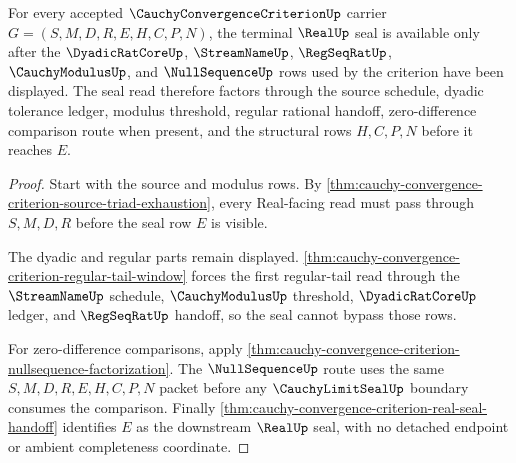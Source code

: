 \begin{theorem}
\label{thm:cauchy-convergence-criterion-real-seal-route}
For every accepted $\CauchyConvergenceCriterionUp$ carrier $G=(S,M,D,R,E,H,C,P,N)$, the terminal $\RealUp$ seal is available only after the $\DyadicRatCoreUp$, $\StreamNameUp$, $\RegSeqRatUp$, $\CauchyModulusUp$, and $\NullSequenceUp$ rows used by the criterion have been displayed. The seal read therefore factors through the source schedule, dyadic tolerance ledger, modulus threshold, regular rational handoff, zero-difference comparison route when present, and the structural rows $H,C,P,N$ before it reaches $E$.
\end{theorem}
\begin{proof}
Start with the source and modulus rows. By \autoref{thm:cauchy-convergence-criterion-source-triad-exhaustion}, every Real-facing read must pass through $S,M,D,R$ before the seal row $E$ is visible.

The dyadic and regular parts remain displayed. \autoref{thm:cauchy-convergence-criterion-regular-tail-window} forces the first regular-tail read through the $\StreamNameUp$ schedule, $\CauchyModulusUp$ threshold, $\DyadicRatCoreUp$ ledger, and $\RegSeqRatUp$ handoff, so the seal cannot bypass those rows.

For zero-difference comparisons, apply \autoref{thm:cauchy-convergence-criterion-nullsequence-factorization}. The $\NullSequenceUp$ route uses the same $S,M,D,R,E,H,C,P,N$ packet before any $\CauchyLimitSealUp$ boundary consumes the comparison. Finally \autoref{thm:cauchy-convergence-criterion-real-seal-handoff} identifies $E$ as the downstream $\RealUp$ seal, with no detached endpoint or ambient completeness coordinate.
\end{proof}

